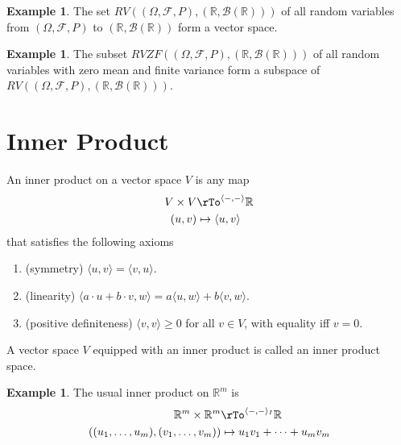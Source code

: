 \documentclass[12pt]{amsart}
\theoremstyle{definition}
\newtheorem{example}[theorem]{Example}
\begin{document}
\begin{example} \label{random_variables} The set $RV((\Omega, \mathcal{F},P), (\mathbb{R},\mathcal{B}(\mathbb{R})))$ of all random variables from $(\Omega, \mathcal{F},P)$ to $(\mathbb{R},\mathcal{B}(\mathbb{R}))$ form a vector space.
\end{example}
\vspace{30pt}

\begin{example} \label{random_variables_zero_finite} The subset $RVZF((\Omega, \mathcal{F},P), (\mathbb{R},\mathcal{B}(\mathbb{R})))$ of all random variables with zero mean and finite variance form a subspace of $RV((\Omega, \mathcal{F},P), (\mathbb{R},\mathcal{B}(\mathbb{R})))$.
\end{example}
\vfill
\pagebreak

\section{Inner Product}

\dfn An inner product on a vector space $V$ is any map
\begin{align*}
V \times V & \rTo^{\langle -, - \rangle} \mathbb{R} \\
(u, v) & \mapsto \langle u, v \rangle
\end{align*}
that satisfies the following axioms
\begin{enumerate}[\indent 1.]
\item (symmetry) $\langle u, v \rangle = \langle v, u \rangle$.
\item (linearity) $\langle a \cdot u + b \cdot v, w \rangle = a \langle u, w \rangle + b \langle v, w \rangle$.
\item (positive definiteness) $\langle v, v \rangle \geq 0$ for all $v \in V$, with equality iff $v = 0$.
\end{enumerate}

A vector space $V$ equipped with an inner product is called an inner product space.
\vfill
\pagebreak

\begin{example} \label{I_inner_product} The usual inner product on $\mathbb{R}^m$ is
\begin{align*}
\mathbb{R}^m \times \mathbb{R}^m & \rTo^{\langle -, - \rangle_I} \mathbb{R} \\
((u_1, \dots , u_m), (v_1, \dots , v_m)) & \mapsto u_1 v_1 + \dots + u_m v_m
\end{align*}
\end{example}
\end{document}
